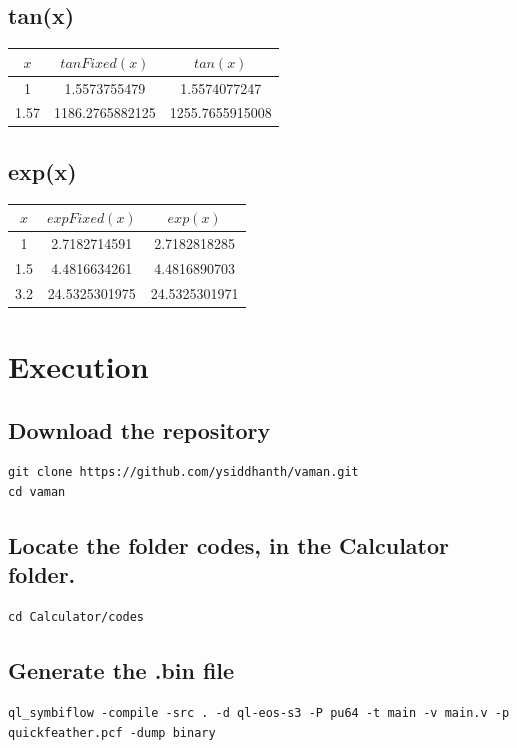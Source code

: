 \documentclass[conference]{IEEEtran}
\begin{document}
\begin{FlushLeft}
\subsection{tan(x)}
\begin{table}[h!]
\centering
\begin{tabular}{|c|c|c|}
\hline
$x$ & $tanFixed(x)$ & $tan(x)$ \\
\hline
1    & 1.5573755479   & 1.5574077247 \\
1.57 & 1186.2765882125 & 1255.7655915008 \\
\hline
\end{tabular}
\end{table}

\subsection{exp(x)}
\begin{table}[h!]
\centering
\begin{tabular}{|c|c|c|}
\hline
$x$ & $expFixed(x)$ & $exp(x)$ \\
\hline
1   & 2.7182714591   & 2.7182818285 \\
1.5 & 4.4816634261   & 4.4816890703 \\
3.2 & 24.5325301975  & 24.5325301971 \\
\hline
\end{tabular}
\end{table}

\section{Execution}
\subsection{Download the repository}
\begin{lstlisting}
git clone https://github.com/ysiddhanth/vaman.git
cd vaman
\end{lstlisting}

\subsection{Locate the folder codes, in the Calculator folder.}
\begin{lstlisting}
cd Calculator/codes
\end{lstlisting}
\subsection{Generate the .bin file}
\begin{footnotesize}
\begin{lstlisting}
ql_symbiflow -compile -src . -d ql-eos-s3 -P pu64 -t main -v main.v -p quickfeather.pcf -dump binary
\end{lstlisting}
\end{footnotesize}


\end{FlushLeft}
\end{document}

